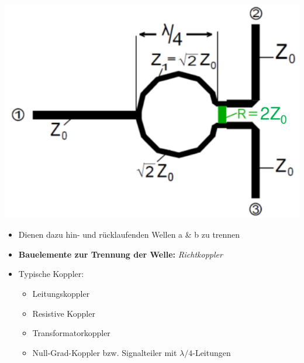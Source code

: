 {\begin{minipage}{.4\paperheight}
    \includegraphics[width=.12\paperheight]{content/fuw/pictures/fuw_wilkinsonteiler2.png}
\end{minipage}
\begin{itemize}
    \itemsep0pt
    \item Dienen dazu hin- und rücklaufenden Wellen a \& b zu trennen
    \item \textbf{Bauelemente zur Trennung der Welle:} \textit{Richtkoppler}
    \item Typische Koppler:
        \begin{itemize}
            \itemsep0pt
            \item Leitungskoppler
            \item Resistive Koppler
            \item Transformatorkoppler
            \item Null-Grad-Koppler bzw. Signalteiler mit $\lambda/4$-Leitungen
        \end{itemize}
\end{itemize}
}
